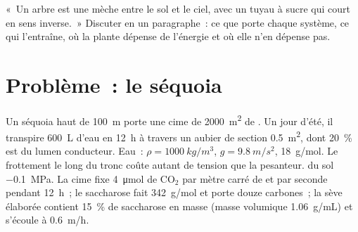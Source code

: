 \begin{exercise}[$\star\star\star$]\label{exo:b1:plant-transport:12}
«~Un arbre est une mèche entre le sol et le ciel, avec un tuyau à sucre
qui court en sens inverse.~» Discuter en un paragraphe~: ce que porte
chaque système, ce qui l'entraîne, où la plante dépense de l'énergie et
où elle n'en dépense pas.
\end{exercise}

\section{Problème~: le séquoia}

\begin{problem}
\label{pb:b1:plant-transport:1}
Un séquoia haut de \qty{100}{m} porte une cime de \qty{2000}{m^2} de
. Un jour d'été, il transpire \qty{600}{L} d'eau en
\qty{12}{h} à travers un aubier de section \qty{0.5}{m^2}, dont
\qty{20}{\%} est du lumen conducteur. Eau~: $\rho = \qty{1000}{kg/m^3}$, $g =
\qty{9.8}{m/s^2}$, \qty{18}{g/mol}. Le frottement le long du tronc
coûte autant de tension que la pesanteur.  du sol
\qty{-0.1}{MPa}. La cime fixe \qty{4}{\micro mol} de $\mathrm{CO_2}$
par mètre carré de  et par seconde pendant \qty{12}{h}~; le
saccharose fait \qty{342}{g/mol} et porte douze carbones~; la sève
élaborée contient \qty{15}{\%} de saccharose en masse (masse volumique
\qty{1.06}{g/mL}) et s'écoule à \qty{0.6}{m/h}.


\end{problem}
